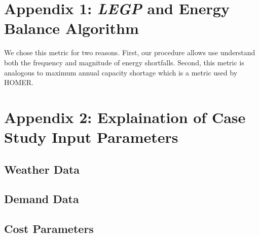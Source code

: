\documentclass{article}
\begin{document}
\appendix	
\section{Appendix 1: \emph{LEGP} and Energy Balance Algorithm} \label{A1}

We chose this metric for two reasons.
First, our procedure allows use understand both the frequency and magnitude of energy shortfalls. 
Second, this metric is analogous to maximum annual capacity shortage which is a metric used by HOMER.


\section{Appendix 2: Explaination of Case Study Input Parameters} \label{A2}

\subsection{Weather Data}
\subsection{Demand Data}
\subsection{Cost Parameters}
\end{document}
